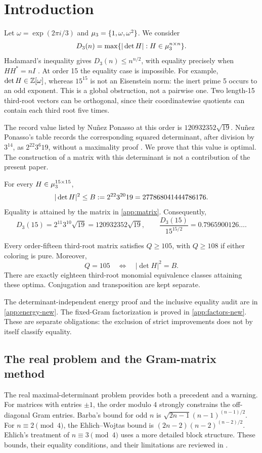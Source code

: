 \section{Introduction}
Let $\omega=\exp(2\pi i/3)$ and $\mu_3=\{1,\omega,\omega^2\}$. We consider
\[
 D_3(n)=\max\{|\det H|:H\in\mu_3^{n\times n}\}.
\]
Hadamard's inequality gives $D_3(n)\le n^{n/2}$, with equality precisely when $HH^*=nI$ \cite{Hadamard,Butson}. At order 15 the equality case is impossible. For example, $\det H\in\mathbb Z[\omega]$, whereas $15^{15}$ is not an Eisenstein norm: the inert prime 5 occurs to an odd exponent. This is a global obstruction, not a pairwise one. Two length-15 third-root vectors can be orthogonal, since their coordinatewise quotients can contain each third root five times.

The record value listed by Nu\~nez Ponasso at this order is $120932352\sqrt{19}$. Nu\~nez Ponasso's table records the corresponding squared determinant, after division by $3^{14}$, as $2^{22}3^6 19$, without a maximality proof \cite{Nunez}. We prove that this value is optimal. The construction of a matrix with this determinant is not a contribution of the present paper.

\begin{theorem}\label{thm:main}
For every $H\in\mu_3^{15\times15}$,
\[
 |\det H|^2\le B:=2^{22}3^{20}19=277868041444786176.
\]
Equality is attained by the matrix in \cref{app:matrix}. Consequently,
\[
 D_3(15)=2^{11}3^{10}\sqrt{19}=120932352\sqrt{19},
 \qquad \frac{D_3(15)}{15^{15/2}}=0.7965900126\ldots.
\]
\end{theorem}

\begin{theorem}\label{thm:extended-main}
Every order-fifteen third-root matrix satisfies $Q\ge105$, with $Q\ge108$ if either coloring is pure. Moreover,
\[Q=105\quad\Longleftrightarrow\quad |\det H|^2=B.\]
There are exactly eighteen third-root monomial equivalence classes attaining these optima. Conjugation and transposition are kept separate.
\end{theorem}
The determinant-independent energy proof and the inclusive equality audit are in \cref{app:energy-new}. The fixed-Gram factorization is proved in \cref{app:factors-new}. These are separate obligations: the exclusion of strict improvements does not by itself classify equality.

\subsection{The real problem and the Gram-matrix method}
The real maximal-determinant problem provides both a precedent and a warning. For matrices with entries $\pm1$, the order modulo 4 strongly constrains the off-diagonal Gram entries. Barba's bound for odd $n$ is $\sqrt{2n-1}(n-1)^{(n-1)/2}$. For $n\equiv2\pmod4$, the Ehlich--Wojtas bound is $(2n-2)(n-2)^{(n-2)/2}$. Ehlich's treatment of $n\equiv3\pmod4$ uses a more detailed block structure. These bounds, their equality conditions, and their limitations are reviewed in \cite{Survey}.

